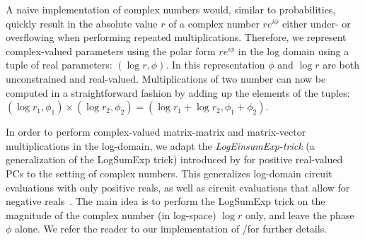A naive implementation of complex numbers would, similar to probabilities, quickly result in the absolute value $r$ of a complex number $r e^{i \phi}$ either under- or overflowing when performing repeated multiplications.
Therefore, we represent complex-valued parameters using the polar form $r e^{i \phi}$ in the log domain using a tuple of real parameters: $(\log{r},  \phi)$.
In this representation $\phi$ and $\log r$ are both unconstrained and real-valued.
Multiplications of two number can now be computed in a straightforward fashion by adding up the elements of the tuples:
$(\log{r_1},  \phi_1) \times (\log{r_2},  \phi_2) = (\log{r_1}+\log{r_2},  \phi_1+ \phi_2) $.

In order to perform complex-valued matrix-matrix and matrix-vector multiplications in the log-domain, we adapt the \textit{LogEinsumExp-trick} (a generalization of the LogSumExp trick) introduced by \citet{peharz2020einsum} for positive real-valued PCs to the setting of complex numbers. This generalizes log-domain circuit evaluations with only positive reals, as well as circuit evaluations that allow for negative reals~\citep{correia2019towards,maua2018robustifying}.
The main idea is to perform the LogSumExp trick on the magnitude of the complex number (in log-space) $\log r$ only, and leave the phase $\phi$ alone.
We refer the reader to our implementation of \pocs/\pvcs for further details.







